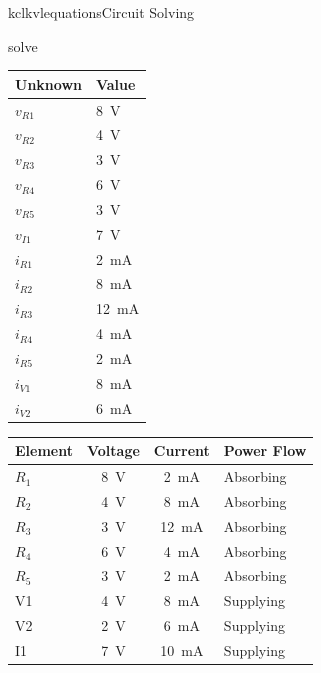 \begin{mainquestion}{kclkvlequations}{Circuit Solving}
\begin{partquestion}{solve}
\begin{answer}
\begin{table}[htbp]
\begin{minipage}[t]{0.37\textwidth}
\centering
\begin{tabular}{|l|l|}
\hline
Unknown & Value \\ \hline
$v_{R1}$ & \qty{8}{\volt} \\ \hline
$v_{R2}$ & \qty{4}{\volt} \\ \hline
$v_{R3}$ & \qty{3}{\volt} \\ \hline
$v_{R4}$ & \qty{6}{\volt} \\ \hline
$v_{R5}$ & \qty{3}{\volt} \\ \hline
$v_{I1}$ & \qty{7}{\volt} \\ \hline
$i_{R1}$ & \qty{2}{\milli\ampere} \\ \hline
$i_{R2}$ & \qty{8}{\milli\ampere} \\ \hline
$i_{R3}$ & \qty{12}{\milli\ampere} \\ \hline
$i_{R4}$ & \qty{4}{\milli\ampere} \\ \hline
$i_{R5}$ & \qty{2}{\milli\ampere} \\ \hline
$i_{V1}$ & \qty{8}{\milli\ampere} \\ \hline
$i_{V2}$ & \qty{6}{\milli\ampere} \\ \hline
\end{tabular}
\end{minipage}
\hfill
\begin{minipage}[t]{0.60\textwidth}
\centering
\begin{tabular}{|l|c|c|l|}
\hline
Element & Voltage & Current & Power Flow \\ \hline
$R_1$ & \qty{8}{\volt} & \qty{2}{\milli\ampere} & Absorbing \\ \hline
$R_2$ & \qty{4}{\volt} & \qty{8}{\milli\ampere} & Absorbing \\ \hline
$R_3$ & \qty{3}{\volt} & \qty{12}{\milli\ampere} & Absorbing \\ \hline
$R_4$ & \qty{6}{\volt} & \qty{4}{\milli\ampere} & Absorbing \\ \hline
$R_5$ & \qty{3}{\volt} & \qty{2}{\milli\ampere} & Absorbing \\ \hline
V1 & \qty{4}{\volt} & \qty{8}{\milli\ampere} & Supplying \\ \hline
V2 & \qty{2}{\volt} & \qty{6}{\milli\ampere} & Supplying \\ \hline
I1 & \qty{7}{\volt} & \qty{10}{\milli\ampere} & Supplying \\ \hline
\end{tabular}
\end{minipage}


\end{table}
\end{answer}
\end{partquestion}
\end{mainquestion}
